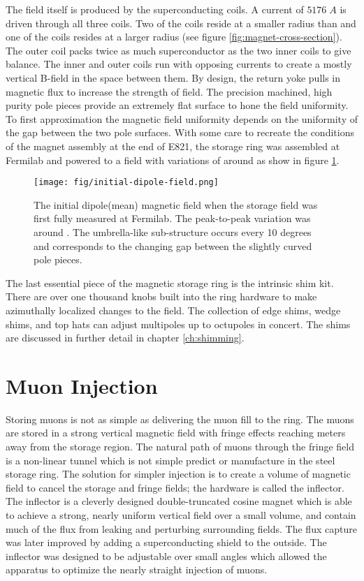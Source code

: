 The field itself is produced by the superconducting coils.  A current of $5176\;A$ is driven through all three coils.  Two of the coils reside at a smaller radius than \rmagic and one of the coils resides at a larger radius (see figure \ref{fig:magnet-cross-section}).  The outer coil packs twice as much superconductor as the two inner coils to give balance.  The inner and outer coils run with opposing currents to create a mostly vertical B-field in the space between them.  By design, the return yoke pulls in magnetic flux to increase the strength of field.  The precision machined, high purity pole pieces provide an extremely flat surface to hone the field uniformity.  To first approximation the magnetic field uniformity depends on the uniformity of the gap between the two pole surfaces.  With some care to recreate the  conditions of the magnet assembly at the end of E821, the storage ring was assembled at Fermilab and powered to a field with variations of around  as show in figure \ref{fig:initial-field}.

\begin{figure}
\texttt{[image: fig/initial-dipole-field.png]}
\caption{The initial dipole(mean) magnetic field when the storage field was first fully measured at Fermilab.  The peak-to-peak variation was around .  The umbrella-like sub-structure occurs every 10 degrees and corresponds to the changing gap between the slightly curved pole pieces.}
\label{fig:initial-field}
\end{figure}

The last essential piece of the magnetic storage ring is the intrinsic shim kit.  There are over one thousand knobs built into the ring hardware to make azimuthally localized changes to the field.  The collection of edge shims, wedge shims, and top hats can adjust multipoles up to octupoles in concert.  The shims are discussed in further detail in chapter \ref{ch:shimming}.

\section{Muon Injection} \label{sec:muon-storage}

Storing muons is not as simple as delivering the muon fill to the ring.  The muons are stored in a strong vertical magnetic field with fringe effects reaching meters away from the storage region.  The natural path of muons through the fringe field is a non-linear tunnel which is not simple predict or manufacture in the steel storage ring.  The solution for simpler injection is to create a volume of magnetic field to cancel the storage and fringe fields; the hardware is called the inflector.  The inflector is a cleverly designed double-truncated cosine magnet which is able to achieve a strong, nearly uniform vertical field over a small volume, and contain much of the flux from leaking and perturbing surrounding fields.  The flux capture was later improved by adding a superconducting shield to the outside.  The inflector was designed to be adjustable over small angles which allowed the apparatus to optimize the nearly straight injection of muons. \cite{e821-prd}

